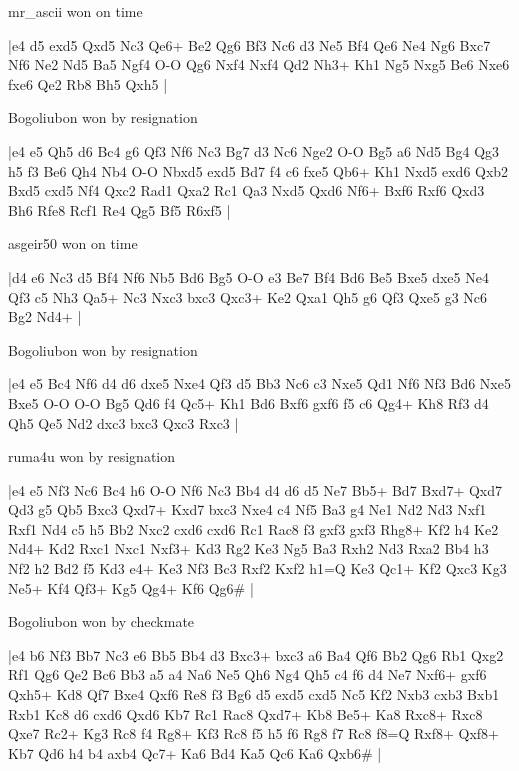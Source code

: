 \showboard

mr\_ascii won on time

\makegametitle
|e4 d5 exd5 Qxd5 Nc3 Qe6+ Be2 Qg6 Bf3 Nc6 d3 Ne5 Bf4 Qe6 Ne4 Ng6 Bxc7 Nf6 Ne2 Nd5 Ba5 Ngf4 O-O Qg6 Nxf4 Nxf4 Qd2 Nh3+ Kh1 Ng5 Nxg5 Be6 Nxe6 fxe6 Qe2 Rb8 Bh5 Qxh5  |

\showboard

Bogoliubon won by resignation

\makegametitle
|e4 e5 Qh5 d6 Bc4 g6 Qf3 Nf6 Nc3 Bg7 d3 Nc6 Nge2 O-O Bg5 a6 Nd5 Bg4 Qg3 h5 f3 Be6 Qh4 Nb4 O-O Nbxd5 exd5 Bd7 f4 c6 fxe5 Qb6+ Kh1 Nxd5 exd6 Qxb2 Bxd5 cxd5 Nf4 Qxc2 Rad1 Qxa2 Rc1 Qa3 Nxd5 Qxd6 Nf6+ Bxf6 Rxf6 Qxd3 Bh6 Rfe8 Rcf1 Re4 Qg5 Bf5 R6xf5  |

\showboard

asgeir50 won on time

\makegametitle
|d4 e6 Nc3 d5 Bf4 Nf6 Nb5 Bd6 Bg5 O-O e3 Be7 Bf4 Bd6 Be5 Bxe5 dxe5 Ne4 Qf3 c5 Nh3 Qa5+ Nc3 Nxc3 bxc3 Qxc3+ Ke2 Qxa1 Qh5 g6 Qf3 Qxe5 g3 Nc6 Bg2 Nd4+  |

\showboard

Bogoliubon won by resignation

\makegametitle
|e4 e5 Bc4 Nf6 d4 d6 dxe5 Nxe4 Qf3 d5 Bb3 Nc6 c3 Nxe5 Qd1 Nf6 Nf3 Bd6 Nxe5 Bxe5 O-O O-O Bg5 Qd6 f4 Qc5+ Kh1 Bd6 Bxf6 gxf6 f5 c6 Qg4+ Kh8 Rf3 d4 Qh5 Qe5 Nd2 dxc3 bxc3 Qxc3 Rxc3  |

\showboard

ruma4u won by resignation

\makegametitle
|e4 e5 Nf3 Nc6 Bc4 h6 O-O Nf6 Nc3 Bb4 d4 d6 d5 Ne7 Bb5+ Bd7 Bxd7+ Qxd7 Qd3 g5 Qb5 Bxc3 Qxd7+ Kxd7 bxc3 Nxe4 c4 Nf5 Ba3 g4 Ne1 Nd2 Nd3 Nxf1 Rxf1 Nd4 c5 h5 Bb2 Nxc2 cxd6 cxd6 Rc1 Rac8 f3 gxf3 gxf3 Rhg8+ Kf2 h4 Ke2 Nd4+ Kd2 Rxc1 Nxc1 Nxf3+ Kd3 Rg2 Ke3 Ng5 Ba3 Rxh2 Nd3 Rxa2 Bb4 h3 Nf2 h2 Bd2 f5 Kd3 e4+ Ke3 Nf3 Bc3 Rxf2 Kxf2 h1=Q Ke3 Qc1+ Kf2 Qxc3 Kg3 Ne5+ Kf4 Qf3+ Kg5 Qg4+ Kf6 Qg6\#  |

\showboard

Bogoliubon won by checkmate

\makegametitle
|e4 b6 Nf3 Bb7 Nc3 e6 Bb5 Bb4 d3 Bxc3+ bxc3 a6 Ba4 Qf6 Bb2 Qg6 Rb1 Qxg2 Rf1 Qg6 Qe2 Bc6 Bb3 a5 a4 Na6 Ne5 Qh6 Ng4 Qh5 c4 f6 d4 Ne7 Nxf6+ gxf6 Qxh5+ Kd8 Qf7 Bxe4 Qxf6 Re8 f3 Bg6 d5 exd5 cxd5 Nc5 Kf2 Nxb3 cxb3 Bxb1 Rxb1 Kc8 d6 cxd6 Qxd6 Kb7 Rc1 Rac8 Qxd7+ Kb8 Be5+ Ka8 Rxc8+ Rxc8 Qxe7 Rc2+ Kg3 Rc8 f4 Rg8+ Kf3 Rc8 f5 h5 f6 Rg8 f7 Rc8 f8=Q Rxf8+ Qxf8+ Kb7 Qd6 h4 b4 axb4 Qc7+ Ka6 Bd4 Ka5 Qc6 Ka6 Qxb6\#  |

